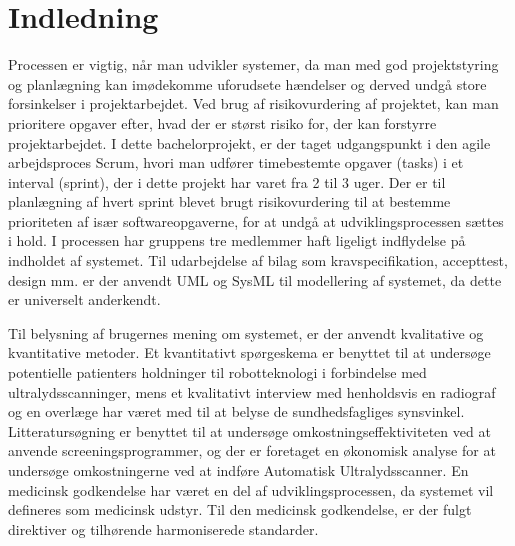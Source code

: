 \chapter{Indledning}\label{kapInd}
Processen er vigtig, når man udvikler systemer, da man med god projektstyring og planlægning kan imødekomme uforudsete hændelser og derved undgå store forsinkelser i projektarbejdet. Ved brug af risikovurdering af projektet, kan man prioritere opgaver efter, hvad der er størst risiko for, der kan forstyrre projektarbejdet. I dette bachelorprojekt, er der taget udgangspunkt i den agile arbejdsproces Scrum, hvori man udfører timebestemte opgaver (tasks) i et interval (sprint), der i dette projekt har varet fra 2 til 3 uger. Der er til planlægning af hvert sprint blevet brugt risikovurdering til at bestemme prioriteten af især softwareopgaverne, for at undgå at udviklingsprocessen sættes i hold. 
I processen har gruppens tre medlemmer haft ligeligt indflydelse på indholdet af systemet. Til udarbejdelse af bilag som kravspecifikation, accepttest, design mm. er der anvendt UML og SysML til modellering af systemet, da dette er universelt anderkendt.

Til belysning af brugernes mening om systemet, er der anvendt kvalitative og kvantitative
metoder. Et kvantitativt spørgeskema er benyttet til at undersøge potentielle patienters
holdninger til robotteknologi i forbindelse med ultralydsscanninger, mens et kvalitativt
interview med henholdsvis en radiograf og en overlæge har været med til at belyse de sundhedsfagliges
synsvinkel. Litteratursøgning er benyttet til at undersøge omkostningseffektiviteten ved at anvende screeningsprogrammer, og der er foretaget en økonomisk analyse for at undersøge omkostningerne ved at indføre Automatisk Ultralydsscanner. En medicinsk godkendelse har været en del af udviklingsprocessen, da systemet vil defineres som medicinsk udstyr. Til den medicinsk godkendelse, er der fulgt direktiver og tilhørende harmoniserede standarder. 



